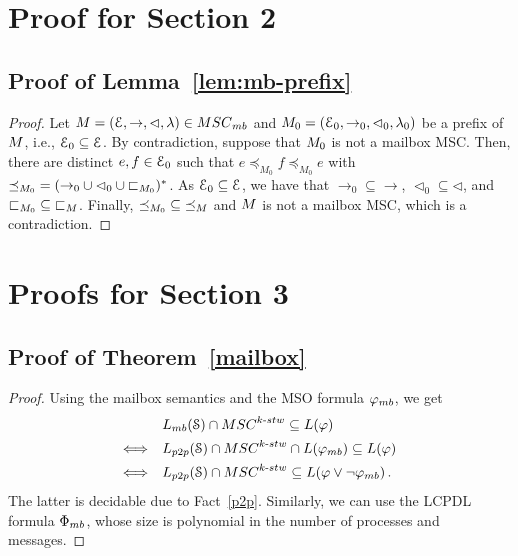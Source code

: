 \documentclass[a4paper,UKenglish,cleveref, autoref, thm-restate]{lipics-v2021}
\begin{document}
\section{Proof for Section 2}

\subsection{Proof of Lemma~\ref{lem:mb-prefix}}
\label{app:mb-prefix}

\prefixmailbox*

\begin{proof}
	Let $\msc = (\Events, \procrel, \lhd, \lambda) \in \mbMSCs$ and $M_0 =
	(\mathcal{E}_0, \to_0, \lhd_0, \lambda_0)$ be a prefix of $M$, i.e.,
	$\mathcal{E}_0 \subseteq \mathcal{E}$. By contradiction, suppose that $M_0$ is not a
	mailbox MSC. Then, there are distinct $e,f \in \mathcal{E}_0$ such that $e \preceq_{M_0} f \preceq_{M_0}
	e$ with ${\preceq_{M_0}} = ({\rightarrow_0} \cup {\lhd_0} \cup {\sqsubset_{M_0}})^*$.
	As $\mathcal{E}_0 \subseteq \mathcal{E}$, we have that ${\rightarrow_0} \subseteq {\rightarrow}$, ${\lhd_0} \subseteq {\lhd}$, and ${\sqsubset_{M_0}} \subseteq {\sqsubset_{M}}$. Finally, ${\preceq_{M_0}} \subseteq {\preceq_{M}}$ and $M$ is not a mailbox MSC, which is a contradiction.
\end{proof}






\section{Proofs for Section 3}

\subsection{Proof of Theorem~\ref{mailbox}}
\label{app:mailbox}

\boundedmc*

\begin{proof}
Using the mailbox semantics and the MSO formula $\mbformula$, we get
\[\begin{array}{rl}
 &\mbL{\System} \cap \stwMSCs{k} \subseteq L(\phi)\\[1ex]
 \Longleftrightarrow &\ppL{\System} \cap \stwMSCs{k}\cap L(\mbformula)  \subseteq L(\phi)\\[1ex]
 \Longleftrightarrow &\ppL{\System} \cap \stwMSCs{k} \subseteq L(\phi \vee \neg \mbformula)\,.
\end{array}\]
The latter is decidable due to Fact~\ref{p2p}.
Similarly, we can use the LCPDL formula $\mbFormula$, whose size is polynomial in the number of processes and messages.
\end{proof}
\end{document}
